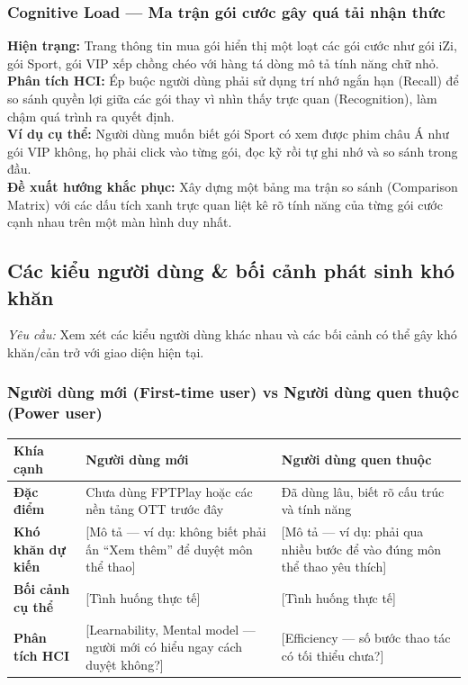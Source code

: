 \subsubsection{Cognitive Load --- Ma trận gói cước gây quá tải nhận thức}
\textbf{Hiện trạng:} Trang thông tin mua gói hiển thị một loạt các gói cước như gói iZi, gói Sport, gói VIP xếp chồng chéo với hàng tá dòng mô tả tính năng chữ nhỏ.\\
\textbf{Phân tích HCI:} Ép buộc người dùng phải sử dụng trí nhớ ngắn hạn (Recall) để so sánh quyền lợi giữa các gói thay vì nhìn thấy trực quan (Recognition), làm chậm quá trình ra quyết định.\\
\textbf{Ví dụ cụ thể:} Người dùng muốn biết gói Sport có xem được phim châu Á như gói VIP không, họ phải click vào từng gói, đọc kỹ rồi tự ghi nhớ và so sánh trong đầu.\\
\textbf{Đề xuất hướng khắc phục:} Xây dựng một bảng ma trận so sánh (Comparison Matrix) với các dấu tích xanh trực quan liệt kê rõ tính năng của từng gói cước cạnh nhau trên một màn hình duy nhất.

\subsection{Các kiểu người dùng \& bối cảnh phát sinh khó khăn}

\textit{Yêu cầu:} Xem xét các kiểu người dùng khác nhau và các bối cảnh có thể gây khó khăn/cản trở với giao diện hiện tại.

\subsubsection{Người dùng mới (First-time user) vs Người dùng quen thuộc (Power user)}

\begin{center}
\small
\begin{tabularx}{\textwidth}{|l|X|X|}
\hline
\textbf{Khía cạnh} & \textbf{Người dùng mới} & \textbf{Người dùng quen thuộc} \\
\hline
\textbf{Đặc điểm} & Chưa dùng FPTPlay hoặc các nền tảng OTT trước đây & Đã dùng lâu, biết rõ cấu trúc và tính năng \\
\hline
\textbf{Khó khăn dự kiến} & [Mô tả --- ví dụ: không biết phải ấn ``Xem thêm'' để duyệt môn thể thao] & [Mô tả --- ví dụ: phải qua nhiều bước để vào đúng môn thể thao yêu thích] \\
\hline
\textbf{Bối cảnh cụ thể} & [Tình huống thực tế] & [Tình huống thực tế] \\
\hline
\textbf{Phân tích HCI} & [Learnability, Mental model --- người mới có hiểu ngay cách duyệt không?] & [Efficiency --- số bước thao tác có tối thiểu chưa?] \\
\hline
\end{tabularx}
\end{center}

